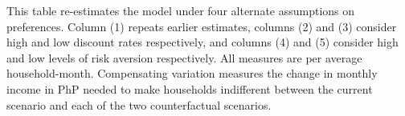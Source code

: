 \documentclass[12pt,table]{article}
\begin{document}
\begin{table}[H]
\begin{threeparttable}
\begin{tabular}{@{}l*{1}{FFFFF}@{}}
\bottomrule
\end{tabular}
\begin{tablenotes}
\item 
\footnotesize
This table re-estimates the model under four alternate assumptions on preferences.  Column (1) repeats earlier estimates, columns (2) and (3) consider high and low discount rates respectively, and columns (4) and (5) consider high and low levels of risk aversion respectively.   All measures are per average household-month. Compensating variation measures the change in monthly income in PhP needed to make households indifferent between the current scenario and each of the two counterfactual scenarios.
\end{tablenotes}
\end{threeparttable}
\end{table}

\end{document}
